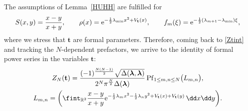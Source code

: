 The assumptions of Lemma~\ref{HUHH} are fulfilled for
\[
S(x,y) = \frac{x - y}{x + y},\qquad \rho(x) = {\rm e}^{-\frac{1}{2}\lambda_{\min} x^2 + V_{\mathbf{t}}(x)},\qquad f_m(\xi) = {\rm e}^{-\frac{1}{2}(\lambda_{m+1} - \lambda_{\min})\xi},
\]
where we stress that $\mathbf{t}$ are formal parameters. Therefore, coming back to \eqref{Ztint} and tracking the $N$-dependent prefactors, we arrive to the identity of formal power series in the variables $\mathbf{t}$:
\begin{gather*}
Z_N(\mathbf{t}) = \frac{(-1)^{\frac{N(N - 1)}{2}} \sqrt{\Delta(\boldsymbol{\lambda},\boldsymbol{\lambda})}}{2^N \pi^{\frac{N}{2}} \Delta(\boldsymbol{\lambda})} \operatorname{Pf}_{1 \leq m,n \leq N} \bigl(L_{m,n}\bigr), \\
L_{m,n} = \biggl(\fint_{\mathbb{R}^2} \frac{x - y}{x + y} {\rm e}^{-\frac{1}{2}\lambda_m x^2 - \frac{1}{2}\lambda_n y^2 + V_{\mathbf{t}}(x) + V_{\mathbf{t}}(y)} \,\dd x \dd y\biggr).%
\end{gather*}


